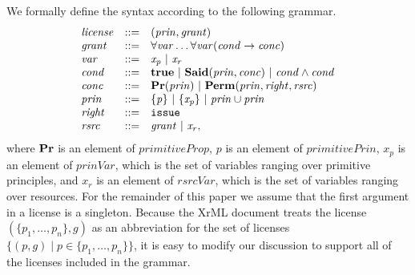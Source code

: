 \documentclass{acmtrans2m}
\newcommand{\<}{
}
\renewcommand{\>}{\rangle}
\newcommand{\union}{\cup}
\newcommand{\Said}{\mathit{\bf Said}}
\newcommand{\true}{\mathit{\bf{true}}}
\newcommand{\Permitted}{\mathit{\bf Perm}}
\renewcommand{\Pr}{\mathit{\bf Pr}}
\newcommand{\lic}{\mathit{license}}
\newcommand{\grant}{\mathit{grant}}
\newcommand{\cond}{\mathit{cond}}
\newcommand{\conc}{\mathit{conc}}
\newcommand{\princ}{\mathit{prin}}
\newcommand{\rht}{\mathit{right}}
\newcommand{\rsrc}{\mathit{rsrc}}
\newcommand{\var}{\mathit{var}}
\newcommand{\princVarSet}{\mathit{prinVar}}
\newcommand{\rsrcVarSet}{\mathit{rsrcVar}}
\newcommand{\princVar}{\mathit{x_p}}
\newcommand{\rsrcVar}{\mathit{x_r}}
\newcommand{\primPrinc}{\mathit{p}}
\newcommand{\issue}{\mathtt{issue}}
\newcommand{\primitiveProp}{\mathit{primitiveProp}}
\newcommand{\primitivePrinc}{\mathit{primitivePrin}}
\newcommand{\imp}{\rightarrow}
\begin{document}
We formally define the syntax according to the following grammar.
\[
\begin{array}{lll}
\lic &::=& (\princ, \grant)\\
\grant &::=& \forall \var \ldots \forall \var (\cond\imp\conc)\\
\var &::=& \princVar ~|~ \rsrcVar\\
\cond &::=& \true ~|~ \Said(\princ, \conc) ~|~ \cond\land\cond \\
\conc &::=& \Pr(\princ) ~|~ \Permitted(\princ, \rht, \rsrc) \\
\princ &::=& \{\primPrinc\} ~|~ \{\princVar\} ~|~ \princ\union\princ \\
\rht &::=& \issue \\
\rsrc &::=& \grant ~|~ \rsrcVar,
\end{array}
\]
where $\Pr$ is an element of $\primitiveProp$, $\primPrinc$ is an element of
$\primitivePrinc$, $\princVar$ is an element of $\princVarSet$, which is the set of variables
ranging over primitive principles, and $\rsrcVar$ is an element of $\rsrcVarSet$, which is the
set of variables ranging over resources.  For the remainder of this paper we assume that the first
argument in a license is a singleton.  Because the XrML document treats the license
$(\{p_1, \ldots, p_n\}, g)$ as an abbreviation for the set of licenses
$\{(p, g)\mid p\in \{p_1, \ldots, p_n\}\}$, it is easy to modify our discussion to support all of the
licenses included in the grammar.
\end{document}
